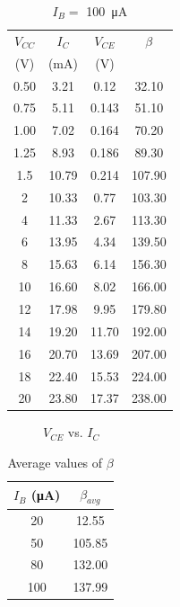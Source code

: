 \begin{table}[hbtp]
  \centering
  \begin{tabular}{cccc}
    $V_{CC}$ & $I_C$     & $V_{CE}$ & $\beta$ \\
    (\si{V}) & (\si{mA}) & (\si{V}) &         \\
    \hline
    0.50     & 3.21      & 0.12     & 32.10   \\
    0.75     & 5.11      & 0.143    & 51.10   \\
    1.00     & 7.02      & 0.164    & 70.20   \\
    1.25     & 8.93      & 0.186    & 89.30   \\
    1.5      & 10.79     & 0.214    & 107.90  \\
    2        & 10.33     & 0.77     & 103.30  \\
    4        & 11.33     & 2.67     & 113.30  \\
    6        & 13.95     & 4.34     & 139.50  \\
    8        & 15.63     & 6.14     & 156.30  \\
    10       & 16.60     & 8.02     & 166.00  \\
    12       & 17.98     & 9.95     & 179.80  \\
    14       & 19.20     & 11.70    & 192.00  \\
    16       & 20.70     & 13.69    & 207.00  \\
    18       & 22.40     & 15.53    & 224.00  \\
    20       & 23.80     & 17.37    & 238.00  \\
    \end{tabular}
    \caption{\label{tab4:}$I_B = $ \SI{100}{\micro\ampere}}
\end{table}

\begin{figure}[hbtp]
  \centering
  \resizebox{1.0\textwidth}{!}{}
  \caption{\label{fig:graph} $V_{CE}$ vs. $I_C$}
\end{figure}

\begin{table}[hbtp]
  \centering
  \begin{tabular}{cc}
    $I_B$ (\si{\micro\ampere}) & $\beta_{avg}$ \\
    \hline
    20                         & 12.55         \\
    50                         & 105.85        \\
    80                         & 132.00        \\
    100                        & 137.99        \\
  \end{tabular}
  \caption{\label{tab:beta_avg} Average values of $\beta$}
\end{table}

